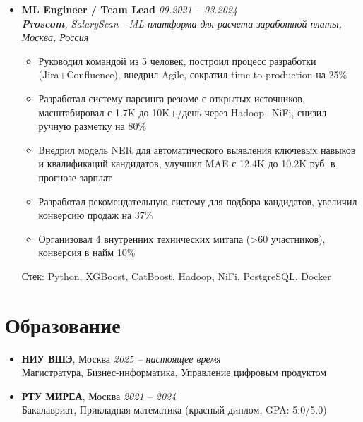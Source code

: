 \documentclass[letterpaper,11pt]{article}
\begin{document}
\begin{itemize}[leftmargin=0.15in, label={}]
    \item \textbf{ML Engineer / Team Lead} \hfill \textit{09.2021 -- 03.2024} \\
    \textit{\textbf{Proscom}, SalaryScan - ML-платформа для расчета заработной платы, Москва, Россия} \\
    \vspace{-10pt}
    \begin{itemize}
        \item Руководил командой из 5 человек, построил процесс разработки (Jira+Confluence), внедрил Agile, сократил time-to-production на 25\%
        \item Разработал систему парсинга резюме с открытых источников, масштабировал с 1.7K до 10K+/день через Hadoop+NiFi, снизил ручную разметку на 80\%
        \item Внедрил модель NER для автоматического выявления ключевых навыков и квалификаций кандидатов, улучшил MAE с 12.4K до 10.2K руб. в прогнозе зарплат
        \item Разработал рекомендательную систему для подбора кандидатов, увеличил конверсию продаж на 37\%
        \item Организовал 4 внутренних технических митапа (>60 участников), конверсия в найм 10\%
    \end{itemize}
    \vspace{-10pt}
    Стек: Python, XGBoost, CatBoost, Hadoop, NiFi, PostgreSQL, Docker
    \vspace{-17pt}
\end{itemize}

\section{Образование}

\begin{itemize}[leftmargin=0.15in, label={}]
    \item \textbf{НИУ ВШЭ}, Москва \hfill \textit{2025 -- настоящее время} \\
    Магистратура, Бизнес-информатика, Управление цифровым продуктом
    \vspace{-10pt}
    
    \item \textbf{РТУ МИРЕА}, Москва \hfill \textit{2021 -- 2024} \\
    Бакалавриат, Прикладная математика (красный диплом, GPA: 5.0/5.0)
    \vspace{-17pt}
\end{itemize}
\end{document}
